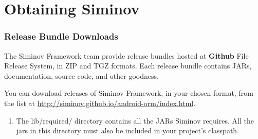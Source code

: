 \newpage
\chapter {\Large{Obtaining Siminov}}



\subsection{Release Bundle Downloads}
The Siminov Framework team provide release bundles hosted at \textbf{Github} File Release System, in ZIP and TGZ formats. Each release bundle contains JARs, documentation, source code, and other goodness.

\par
You can download releases of Siminov Framework, in your chosen format, from the list at \url{http://siminov.github.io/android-orm/index.html}. 

	\begin{enumerate}

		\item \small The lib/required/ directory contains all the JARs Siminov requires. All the jars in this directory must also be included in your project's classpath.

	\end{enumerate}

